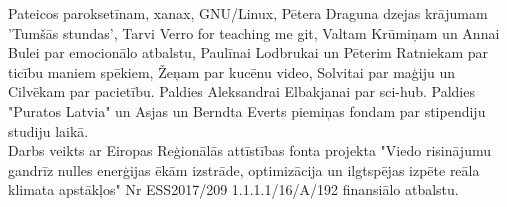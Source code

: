 Pateicos paroksetīnam, xanax, GNU/Linux, Pētera Draguna dzejas krājumam 'Tumšās stundas', Tarvi Verro for teaching me git, Valtam Krūmiņam un Annai Bulei par emocionālo atbalstu, Paulīnai Lodbrukai un Pēterim Ratniekam par ticību maniem spēkiem, Žeņam par kucēnu video, Solvitai par maģiju un Cilvēkam par pacietību. Paldies Aleksandrai Elbakjanai par sci-hub. Paldies "Puratos Latvia" un Asjas un Berndta Everts piemiņas fondam par stipendiju studiju laikā.\\

Darbs veikts ar Eiropas Reģionālās attīstības fonta projekta "Viedo risinājumu gandrīz nulles enerģijas ēkām izstrāde, optimizācija un ilgtspējas izpēte reāla klimata apstākļos" Nr ESS2017/209 1.1.1.1/16/A/192 finansiālo atbalstu.

